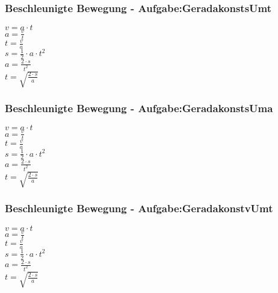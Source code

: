 \subsubsection{Beschleunigte Bewegung - Aufgabe:GeradakonstsUmt} 
\begin{minipage}{0.45\textwidth} 
$ v = a\cdot t $\\ 
$ a = \frac{v}{t} $\\ 
$ t = \frac{v}{a} $\\ 
$ s = \frac{1}{2}\cdot a\cdot t^{2} $\\ 
$ a = \frac{2\cdot s}{t^{2} } $\\ 
$ t = \sqrt{\frac{2\cdot s}{a}} $\\ 
\end{minipage} 
\begin{minipage}{0.45\textwidth} 
 
\end{minipage} 
\subsubsection{Beschleunigte Bewegung - Aufgabe:GeradakonstsUma} 
\begin{minipage}{0.45\textwidth} 
$ v = a\cdot t $\\ 
$ a = \frac{v}{t} $\\ 
$ t = \frac{v}{a} $\\ 
$ s = \frac{1}{2}\cdot a\cdot t^{2} $\\ 
$ a = \frac{2\cdot s}{t^{2} } $\\ 
$ t = \sqrt{\frac{2\cdot s}{a}} $\\ 
\end{minipage} 
\begin{minipage}{0.45\textwidth} 
 
\end{minipage} 
\subsubsection{Beschleunigte Bewegung - Aufgabe:GeradakonstvUmt} 
\begin{minipage}{0.45\textwidth} 
$ v = a\cdot t $\\ 
$ a = \frac{v}{t} $\\ 
$ t = \frac{v}{a} $\\ 
$ s = \frac{1}{2}\cdot a\cdot t^{2} $\\ 
$ a = \frac{2\cdot s}{t^{2} } $\\ 
$ t = \sqrt{\frac{2\cdot s}{a}} $\\ 
\end{minipage} 
\begin{minipage}{0.45\textwidth} 
 
\end{minipage} 
